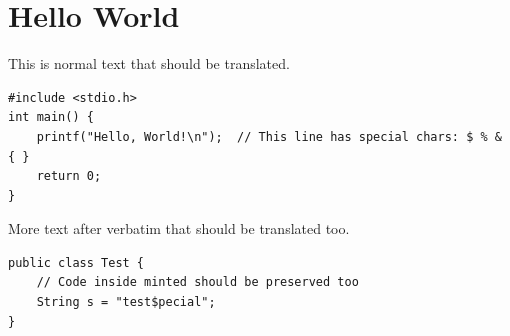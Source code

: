 \documentclass{article}
\begin{document}
\section{Hello World}
This is normal text that should be translated.

\begin{verbatim}
#include <stdio.h>
int main() {
    printf("Hello, World!\n");  // This line has special chars: $ % & { }
    return 0;
}
\end{verbatim}

More text after verbatim that should be translated too.


\begin{verbatim}
public class Test {
    // Code inside minted should be preserved too
    String s = "test$pecial";
}
\end{verbatim}
\end{document}
